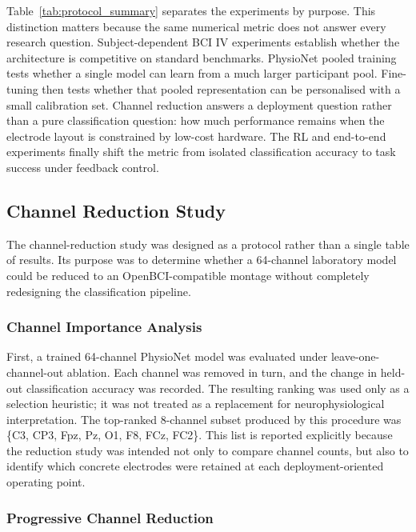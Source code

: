 \documentclass[12pt, a4paper]{article}
\begin{document}
Table~\ref{tab:protocol_summary} separates the experiments by purpose. This distinction matters because the same numerical metric does not answer every research question. Subject-dependent BCI IV experiments establish whether the architecture is competitive on standard benchmarks. PhysioNet pooled training tests whether a single model can learn from a much larger participant pool. Fine-tuning then tests whether that pooled representation can be personalised with a small calibration set. Channel reduction answers a deployment question rather than a pure classification question: how much performance remains when the electrode layout is constrained by low-cost hardware. The RL and end-to-end experiments finally shift the metric from isolated classification accuracy to task success under feedback control.

\subsection{Channel Reduction Study}

The channel-reduction study was designed as a protocol rather than a single table of results. Its purpose was to determine whether a 64-channel laboratory model could be reduced to an OpenBCI-compatible montage without completely redesigning the classification pipeline.

\subsubsection{Channel Importance Analysis}

First, a trained 64-channel PhysioNet model was evaluated under leave-one-channel-out ablation. Each channel was removed in turn, and the change in held-out classification accuracy was recorded. The resulting ranking was used only as a selection heuristic; it was not treated as a replacement for neurophysiological interpretation. The top-ranked 8-channel subset produced by this procedure was \{C3, CP3, Fpz, Pz, O1, F8, FCz, FC2\}. This list is reported explicitly because the reduction study was intended not only to compare channel counts, but also to identify which concrete electrodes were retained at each deployment-oriented operating point.

\subsubsection{Progressive Channel Reduction}
\end{document}
